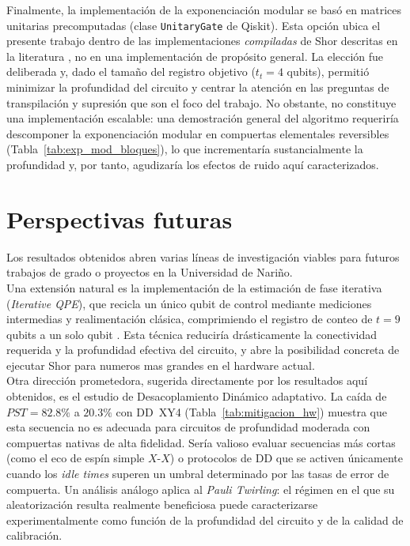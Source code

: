 \documentclass[12pt, spanish]{book}
\begin{document}
Finalmente, la implementación de la exponenciación modular se basó en matrices unitarias precomputadas (clase \texttt{UnitaryGate} de Qiskit). Esta opción ubica el presente trabajo dentro de las implementaciones \emph{compiladas} de Shor descritas en la literatura \cite{Skosana2021,Lanyon2007,smolin2013oversimplifying}, no en una implementación de propósito general. La elección fue deliberada y, dado el tamaño del registro objetivo ($t_t = 4$ qubits), permitió minimizar la profundidad del circuito y centrar la atención en las preguntas de transpilación y supresión que son el foco del trabajo. No obstante, no constituye una implementación escalable: una demostración general del algoritmo requeriría descomponer la exponenciación modular en compuertas elementales reversibles (Tabla~\ref{tab:exp_mod_bloques}), lo que incrementaría sustancialmente la profundidad y, por tanto, agudizaría los efectos de ruido aquí caracterizados.

\section{Perspectivas futuras}

Los resultados obtenidos abren varias líneas de investigación viables para futuros trabajos de grado o proyectos en la Universidad de Nariño.\\

Una extensión natural es la implementación de la estimación de fase iterativa (\textit{Iterative QPE}), que recicla un único qubit de control mediante mediciones intermedias y realimentación clásica, comprimiendo el registro de conteo de $t = 9$ qubits a un solo qubit \cite{Nielsen2024}. Esta técnica reduciría drásticamente la conectividad requerida y la profundidad efectiva del circuito, y abre la posibilidad concreta de ejecutar Shor para numeros mas grandes en el hardware actual.\\

Otra dirección prometedora, sugerida directamente por los resultados aquí obtenidos, es el estudio de Desacoplamiento Dinámico adaptativo. La caída de $PST = 82.8\%$ a $20.3\%$ con DD~XY4 (Tabla~\ref{tab:mitigacion_hw}) muestra que esta secuencia no es adecuada para circuitos de profundidad moderada con compuertas nativas de alta fidelidad. Sería valioso evaluar secuencias más cortas (como el eco de espín simple $X$-$X$) o protocolos de DD que se activen únicamente cuando los \textit{idle times} superen un umbral determinado por las tasas de error de compuerta. Un análisis análogo aplica al \textit{Pauli Twirling}: el régimen en el que su aleatorización resulta realmente beneficiosa puede caracterizarse experimentalmente como función de la profundidad del circuito y de la calidad de calibración.\\
\end{document}
